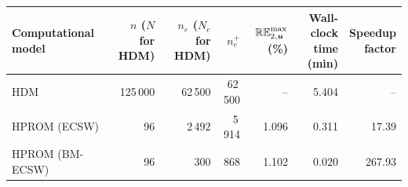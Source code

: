 \begin{tabular}{@{}lrrrrrr@{}}
\toprule
Computational model & \shortstack{$n$\\($N$ for HDM)} & \shortstack{$n_e$\\($N_e$ for HDM)} & $n_e^+$ & $\mathbb{RE}_{2,\boldsymbol{u}}^{\max}$ (\%) & \shortstack{Wall-clock time\\(min)} & \shortstack{Speedup\\factor}\\
\midrule
HDM & 125\,000 & 62\,500 & 62\,500 & -- & 5.404 & --\\
HPROM (ECSW) & 96 & 2\,492 & 5\,914 & 1.096 & 0.311 & 17.39\\
HPROM (BM-ECSW) & 96 & 300 & 868 & 1.102 & 0.020 & 267.93\\
\bottomrule
\end{tabular}
